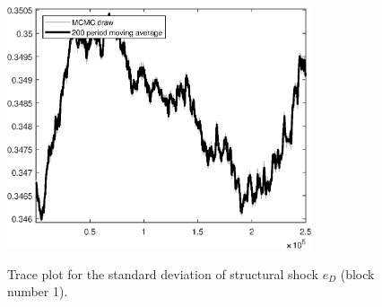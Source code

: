 \begin{figure}[H]
\centering
  \includegraphics[width=0.8\textwidth]{BRS_imp_mobility/graphs/TracePlot_SE_e_D_blck_1}\\
    \caption{Trace plot for the standard deviation of structural shock ${e_D}$ (block number 1).}
\end{figure}
